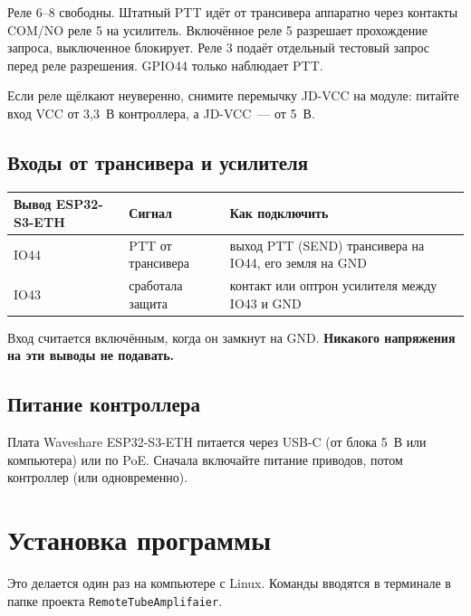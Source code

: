 \documentclass[a4paper,11pt]{article}
\begin{document}
Реле 6--8 свободны. Штатный PTT идёт от трансивера аппаратно через контакты COM/NO реле 5
на усилитель. Включённое реле 5 разрешает прохождение запроса, выключенное блокирует.
Реле 3 подаёт отдельный тестовый запрос перед реле разрешения. GPIO44 только наблюдает PTT.

\begin{hint}
Если реле щёлкают неуверенно, снимите перемычку JD-VCC на модуле: питайте вход VCC от 3,3~В
контроллера, а JD-VCC~— от 5~В.
\end{hint}

\subsection{Входы от трансивера и усилителя}

\begin{center}
\begin{tabular}{@{}lll@{}}
\toprule
\textbf{Вывод ESP32-S3-ETH} & \textbf{Сигнал} & \textbf{Как подключить} \\
\midrule
IO44 & PTT от трансивера & выход PTT (SEND) трансивера на IO44, его земля на GND \\
IO43 & сработала защита & контакт или оптрон усилителя между IO43 и GND \\
\bottomrule
\end{tabular}
\end{center}

Вход считается включённым, когда он замкнут на GND. \textbf{Никакого напряжения на эти выводы не подавать.}

\subsection{Питание контроллера}

Плата Waveshare ESP32-S3-ETH питается через USB-C (от блока 5~В или компьютера) или по PoE.
Сначала включайте питание приводов, потом контроллер (или одновременно).

\section{Установка программы}

Это делается один раз на компьютере с Linux. Команды вводятся в терминале в папке проекта
\texttt{RemoteTubeAmplifaier}.
\end{document}
